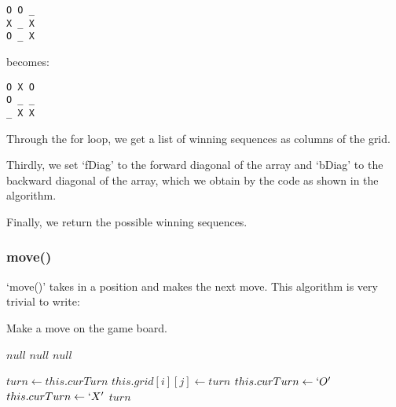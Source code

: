 \documentclass{article}
\begin{document}
\begin{verbatim}
O O _
X _ X
O _ X
\end{verbatim}

becomes:

\begin{verbatim}
O X O
O _ _
_ X X
\end{verbatim}

Through the for loop, we get a list of winning sequences as columns of the grid.

Thirdly, we set `fDiag' to the forward diagonal of the array and `bDiag' to the backward diagonal of the array, which we obtain by the code as shown in the algorithm.

Finally, we return the possible winning sequences.

\subsubsection{move()}

`move()' takes in a position and makes the next move. This algorithm is very trivial to write:

\begin{algorithm}
\caption{Make a move on the game board.}

\begin{algorithmic}[1]
    \Return $null$
    \Return $null$
    \Return $null$
  \EndIf

  \State $turn \gets this.curTurn$
  \State $this.grid[i][j] \gets turn$
    \State $this.curTurn \gets `O'$
    \State $this.curTurn \gets `X'$
  \EndIf
  \Return $turn$
\EndProcedure
\end{algorithmic}
\end{algorithm}
\end{document}
